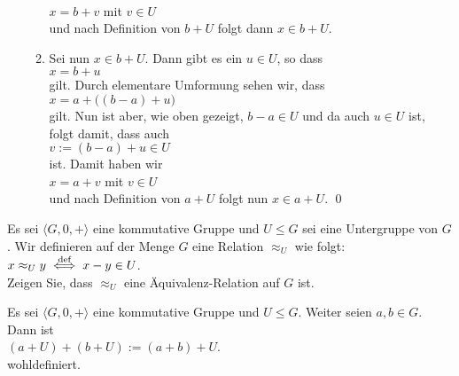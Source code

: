 \begin{enumerate}
\begin{enumerate}
        \\[0.2cm]
        \hspace*{1.3cm}
        $x = b + v$ mit $v \in U$
        \\[0.2cm]
        und nach Definition von $b + U$ folgt dann $x \in b + U$.
  \item Sei nun $x \in b + U$.  Dann gibt es ein $u \in U$, so dass
        \\[0.2cm]
        \hspace*{1.3cm}
        $x = b + u$
        \\[0.2cm]
        gilt.  Durch elementare Umformung sehen wir, dass
        \\[0.2cm]
        \hspace*{1.3cm}
        $x = a + \bigl((b - a) + u\bigr)$
        \\[0.2cm]
        gilt. Nun ist aber, wie oben gezeigt, $b - a \in U$ und da auch $u \in U$ ist, folgt damit, dass auch
        \\[0.2cm]
        \hspace*{1.3cm}
        $v := (b - a) + u \in U$
        \\[0.2cm]
        ist.  Damit haben wir
        \\[0.2cm]
        \hspace*{1.3cm}
        $x = a + v$ mit $v \in U$
        \\[0.2cm]
        und nach Definition von $a + U$ folgt nun $x \in a + U$. \qed
  \end{enumerate}
\end{enumerate}

\exercise
Es sei $\langle G, 0, + \rangle$ eine kommutative Gruppe und $U \leq G$ sei eine
Untergruppe von $G$.   Wir definieren auf der Menge $G$ eine Relation $\approx_U$ wie folgt:
\\[0.2cm]
\hspace*{1.3cm}
$x \approx_U y \;\stackrel{\mbox{\scriptsize def}}{\Longleftrightarrow}\; x - y \in U$.
\\[0.2cm]
Zeigen Sie, dass $\approx_U$ eine Äquivalenz-Relation auf $G$ ist.
\exend

\begin{Lemma}
  Es sei $\langle G, 0, + \rangle$ eine kommutative Gruppe und $U \leq G$.
  Weiter seien $a,b \in G$.  Dann ist 
  \\[0.2cm]
  \hspace*{1.3cm}
  $(a + U) + (b + U) := (a + b) + U$.
  \\[0.2cm]
  wohldefiniert.
\end{Lemma}

